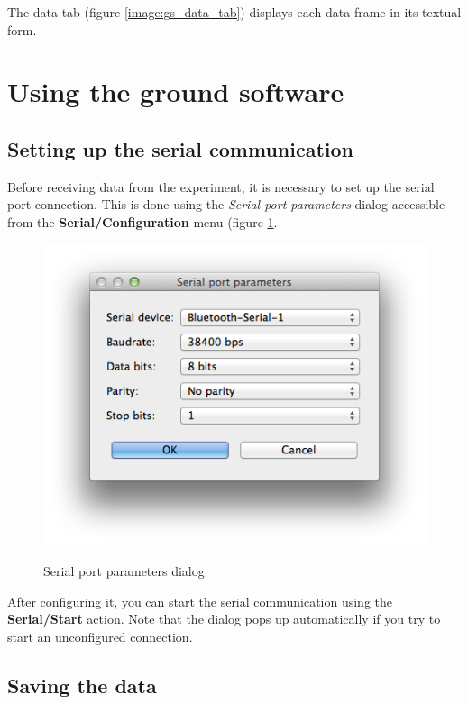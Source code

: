 \documentclass[11pt,a4paper,oneside]{report}
\begin{document}
The data tab (figure \ref{image:gs_data_tab}) displays each data frame in its textual form.

\section{Using the ground software}

\subsection{Setting up the serial communication}

Before receiving data from the experiment, it is necessary to set up the serial port connection.
This is done using the \emph{Serial port parameters} dialog accessible from the \textbf{Serial/Configuration} menu (figure \ref{image:gs_serial_parameters}.

\begin{figure}[!h]
\center
\includegraphics[scale=0.6]{images/gs_serial_parameters.png}
\label{image:gs_serial_parameters}
\caption{Serial port parameters dialog}
\end{figure}

After configuring it, you can start the serial communication using the \textbf{Serial/Start} action.
Note that the dialog pops up automatically if you try to start an unconfigured connection. \\

\subsection{Saving the data}
\end{document}
